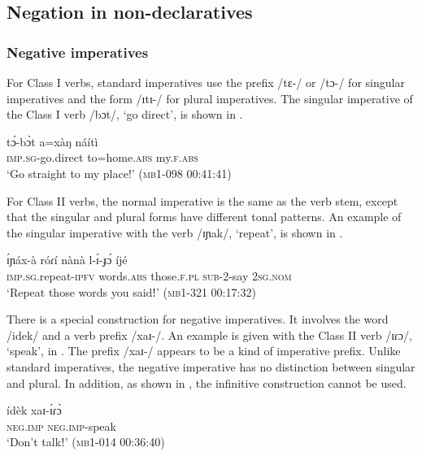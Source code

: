 \documentclass[output=paper,colorlinks,citecolor=brown,draftmode]{langscibook}
\begin{document}
\subsection{Negation in non-declaratives}
\label{sec:lop:2.2}
\subsubsection{Negative imperatives}
\label{sec:lop:2.2.1}
For Class I verbs, standard imperatives use the prefix /tɛ-/ or /tɔ-/ for singular imperatives and the form /ɪtɪ-/ for plural imperatives. The singular imperative of the Class I verb /bɔt/, ‘go direct’, is shown in .

\ea\label{ex:lop:13}
        \gll tɔ́-bɔ̀t a=xàŋ náítì \\ 
             \textsc{imp.sg}{}-go.direct to=home.\textsc{abs} my.\textsc{f.abs} \\
        \glt ‘Go straight to my place!’      (\textsc{mb1-098} \textsc{00}:41:41)
\z

For Class II verbs, the normal imperative is the same as the verb stem, except that the singular and plural forms have different tonal patterns. An example of the singular imperative with the verb /ɪɲak/, ‘repeat’, is shown in . 

\ea\label{ex:lop:14}
        \gll ɪ́ɲáx-à  róɾí nànà l-ɪ́-ɟɔ́ íjé   \\ 
             \textsc{imp.sg}.repeat-\textsc{ipfv} words.\textsc{abs} those.\textsc{f.pl} \textsc{sub}{}-2-say 2\textsc{sg.nom} \\
        \glt ‘Repeat those words you saidǃ’     (\textsc{mb1-321} \textsc{00:}17:32)
\z

There is a special construction for negative imperatives.  It involves the word /idek/ and a verb prefix /xaɪ-/. An example is given with the Class II verb /ɪɾɔ/, ‘speak’, in . The prefix /xaɪ-/ appears to be a kind of imperative prefix. Unlike standard imperatives, the negative imperative has no distinction between singular and plural. In addition, as shown in , the infinitive construction cannot be used.

\ea\label{ex:lop:15}
        \gll ídèk xaɪ-ɪ́ɾɔ̀  \\ 
             \textsc{neg.imp} \textsc{neg.imp}{}-speak \\
        \glt ‘Don’t talkǃ’       (\textsc{mb1-014} \textsc{00}:36:40)
\z

\z
\end{document}
